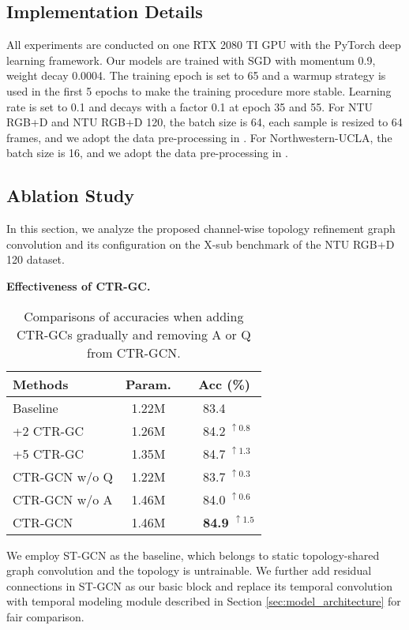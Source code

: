 \documentclass[10pt,twocolumn,letterpaper]{article}
\begin{document}
\subsection{Implementation Details}
All experiments are conducted on one RTX 2080 TI GPU with the PyTorch deep learning framework. Our models are trained with SGD with momentum 0.9, weight decay 0.0004. The training epoch is set to 65 and a warmup strategy \cite{he2016deep} is used in the first 5 epochs to make the training procedure more stable. Learning rate is set to 0.1 and decays with a factor 0.1 at epoch 35 and 55. For NTU RGB+D and NTU RGB+D 120, the batch size is 64, each sample is resized to 64 frames, and we adopt the data pre-processing in \cite{zhang2020semantics}. For Northwestern-UCLA, the batch size is 16, and we adopt the data pre-processing in \cite{cheng2020skeleton}.

\subsection{Ablation Study}
In this section, we analyze the proposed channel-wise topology refinement graph convolution and its configuration on the X-sub benchmark of the NTU RGB+D 120 dataset.

\noindent \textbf{Effectiveness of CTR-GC.}
\begin{table}
	\begin{center}
		\begin{tabular}{l c l}
			\hline
			\textbf{Methods} & \textbf{Param.} & \ \ \textbf{Acc (\%)} \\
			\hline\hline
			Baseline & 1.22M & \ \ \  83.4 \\
			\hline
			+2 CTR-GC & 1.26M & \ \ \ 84.2 $^{\uparrow 0.8}$\\
			+5 CTR-GC & 1.35M & \ \ \ 84.7 $^{\uparrow 1.3}$\\
			\hline
			CTR-GCN w/o Q & 1.22M & \ \ \ 83.7 $^{\uparrow 0.3}$ \\
			CTR-GCN w/o A & 1.46M & \ \ \ 84.0 $^{\uparrow 0.6}$\\
			\hline
			CTR-GCN & 1.46M & \ \ \ \textbf{84.9 $^{\mathbf{\uparrow} \mathbf{1.5}}$} \\
			\hline
		\end{tabular}
	\end{center}
	\vspace{-0.2cm}
	\caption{Comparisons of accuracies when adding CTR-GCs gradually and removing A or Q from CTR-GCN.}
	\vspace{-0.3cm}
	\label{tab:pagc_acc}
\end{table}
We employ ST-GCN \cite{yan2018spatial} as the baseline, which belongs to static topology-shared graph convolution and the topology is untrainable. We further add residual connections in ST-GCN as our basic block and replace its temporal convolution with temporal modeling module described in Section \ref{sec:model_architecture} for fair comparison.
\end{document}
